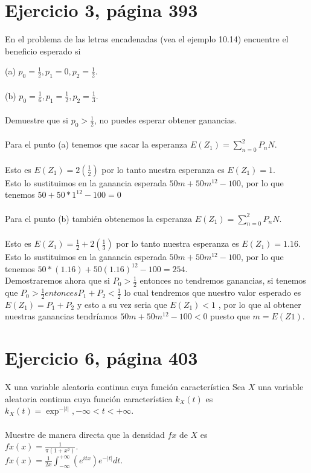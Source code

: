 \documentclass[]{article}
\begin{document}
\section{Ejercicio 3, página 393}
En el problema de las letras encadenadas (vea el ejemplo 10.14) encuentre el beneficio esperado si

(a) $p_{0} = \frac{1}{2}, p_{1} = 0, p_{2} = \frac{1}{2}$.\\
\\
(b) $p_{0} = \frac{1}{6}, p_{1} = \frac{1}{2}, p_{2} = \frac{1}{3}$.\\
\\
Demuestre que si $p_{0} > \frac{1}{2}$, no puedes esperar obtener ganancias.\\
\\
Para el punto (a) tenemos que sacar la esperanza $E(Z_{1}) = \sum_{n=0}^{2} P_{n}N$.\\
\\
Esto es $E(Z_{1}) = 2(\frac{1}{2})$ por lo tanto nuestra esperanza es $E(Z_{1}) = 1$.\\
Esto lo sustituimos en la ganancia esperada $50m + 50m^{12} - 100$, por lo que tenemos  $50 + 50*1^{12} - 100 = 0$\\
\\
Para el punto (b) también obtenemos la esperanza $E(Z_{1}) = \sum_{n=0}^{2} P_{n}N$.\\
\\
Esto es $E(Z_{1}) = \frac{1}{2}+2(\frac{1}{3})$ por lo tanto nuestra esperanza es $E(Z_{1}) = 1.16$.\\
Esto lo sustituimos en la ganancia esperada $50m + 50m^{12} - 100$, por lo que tenemos  $50*(1.16) + 50(1.16)^{12} - 100 = 254$.\\
Demostraremos ahora que si $P_{0} > \frac{1}{2}$ entonces no tendremos ganancias, si tenemos que $P_{0} > \frac{1}{2} entonces P_{1} + P_{2} < \frac{1}{2}$ lo cual tendremos que nuestro valor esperado es $E(Z_{1})= P_{1} + P_{2}$ y esto a su vez seria que $E(Z_{1}) < 1$ , por lo que al obtener nuestras ganancias tendríamos $50m + 50m^{12} - 100 < 0$ puesto que $m = E(Z{1})$. 



\section{Ejercicio 6, página 403}
X una variable aleatoria continua cuya función característica
Sea $X$ una variable aleatoria continua cuya función característica $k_{X}(t)$ es\\
$k_{X}(t) = \exp^{-|t|}, -\infty < t < +\infty$.\\
\\
Muestre de manera directa que la densidad $fx$ de $X$ es\\
$fx(x) = \frac{1}{\pi(1 + x^{2})}$.\\
$fx(x) = \frac{1}{2x}\int_{-\infty}^{+\infty} (e^{itx})e^{-|t|}dt$.
\end{document}
